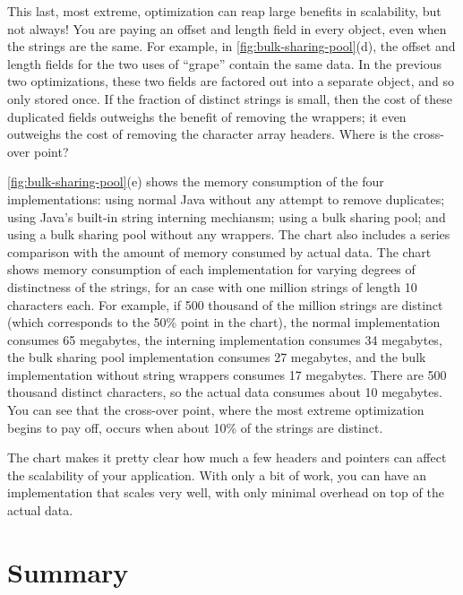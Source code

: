 This last, most extreme, optimization can reap large benefits in scalability,
but not always! You are paying an offset and length field in every object, even
when the strings are the same. For example, in
\autoref{fig:bulk-sharing-pool}(d), the offset and length fields for the two
uses of ``grape'' contain the same data. In the previous two optimizations,
these two fields are factored out into a separate  object, and so
only stored once. If the fraction of distinct strings
is small, then the cost of these duplicated fields outweighs the benefit of
removing the wrappers; it even outweighs the cost of removing the character
array headers. Where is the cross-over point?

\autoref{fig:bulk-sharing-pool}(e) shows the memory consumption of the four
implementations: using normal Java  without any attempt to remove
duplicates; using Java's built-in string interning mechiansm; using a bulk
sharing pool; and using a bulk sharing pool without any  wrappers.
The chart also includes a series comparison with the amount of memory consumed by
actual data.  The chart shows memory consumption of each implementation for
varying degrees of distinctness of the strings, for an case with one million
strings of length 10 characters each.
For example, if 500 thousand of the million strings are distinct (which
corresponds to the 50\% point in the chart), the normal implementation consumes
65 megabytes, the interning implementation consumes 34 megabytes, the bulk
sharing pool implementation consumes 27 megabytes, and the bulk implementation
without string wrappers consumes 17 megabytes. There are 500 thousand
distinct characters, so the actual data consumes about 10 megabytes. You can see
that the cross-over point, where the most extreme optimization begins to pay
off, occurs when about 10\% of the strings are distinct.

The chart makes it pretty clear how much a few headers and pointers can affect
the scalability of your application. With only a bit of work, you can have an
implementation that scales very well, with only minimal overhead on top of the
actual data.


\section{Summary}





